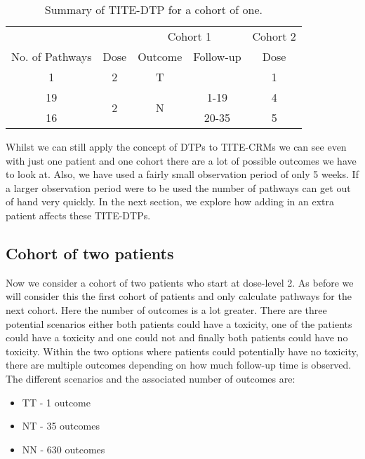 \begin{table}[H]
	\centering
	\caption{Summary of TITE-DTP for a cohort of one.}
	\label{tab_tite-dtp:TITEDTP_c1_Sum}
	\begin{tabular}{ccccc}
		\hline
		\multicolumn{1}{l}{} &                 & \multicolumn{2}{c}{Cohort 1}   & Cohort 2 \\ 
		\cmidrule(l{3pt}r{3pt}){3-4} \cmidrule(l{3pt}r{3pt}){5-5}
		No. of Pathways & Dose                 & Outcome            & Follow-up & Dose     \\ \hline
		1				&  2                   & T                  &           & 1        \\ \hline
		19				&  \multirow{2}{*}{2}  & \multirow{2}{*}{N} & 1-19      & 4        \\
		16				&	 				   &                    & 20-35     & 5        \\ \hline
	\end{tabular}
\end{table}

Whilst we can still apply the concept of DTPs to TITE-CRMs we can see even with just one patient and one cohort there are a lot of possible outcomes we have to look at. Also, we have used a fairly small observation period of only 5 weeks. If a larger observation period were to be used the number of pathways can get out of hand very quickly. In the next section, we explore how adding in an extra patient affects these TITE-DTPs.  


\subsection{Cohort of two patients}
\label{tite-dtp:TITE-DTPs-c2}
Now we consider a cohort of two patients who start at dose-level 2. As before we will consider this the first cohort of patients and only calculate pathways for the next cohort. Here the number of outcomes is a lot greater. There are three potential scenarios either both patients could have a toxicity, one of the patients could have a toxicity and one could not and finally both patients could have no toxicity. Within the two options where patients could potentially have no toxicity, there are multiple outcomes depending on how much follow-up time is observed. The different scenarios and the associated number of outcomes are: 

\begin{itemize}
	\item TT - 1 outcome 
	\item NT - 35 outcomes 
	\item NN - 630 outcomes
\end{itemize}

